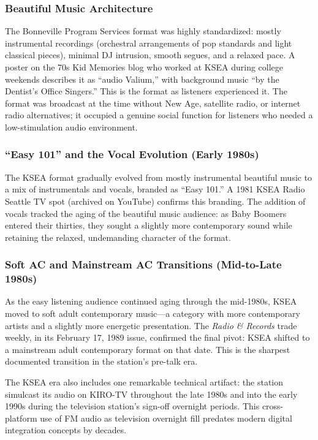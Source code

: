 \documentclass[11pt,letterpaper]{article}
\begin{document}
\subsubsection{Beautiful Music Architecture}

The Bonneville Program Services format was highly standardized: mostly instrumental recordings (orchestral arrangements of pop standards and light classical pieces), minimal DJ intrusion, smooth segues, and a relaxed pace. A poster on the 70s Kid Memories blog who worked at KSEA during college weekends describes it as ``audio Valium,'' with background music ``by the Dentist's Office Singers.'' This is the format as listeners experienced it. The format was broadcast at the time without New Age, satellite radio, or internet radio alternatives; it occupied a genuine social function for listeners who needed a low-stimulation audio environment.

\subsubsection{``Easy 101'' and the Vocal Evolution (Early 1980s)}

The KSEA format gradually evolved from mostly instrumental beautiful music to a mix of instrumentals and vocals, branded as ``Easy 101.'' A 1981 KSEA Radio Seattle TV spot (archived on YouTube) confirms this branding. The addition of vocals tracked the aging of the beautiful music audience: as Baby Boomers entered their thirties, they sought a slightly more contemporary sound while retaining the relaxed, undemanding character of the format.

\subsubsection{Soft AC and Mainstream AC Transitions (Mid-to-Late 1980s)}

As the easy listening audience continued aging through the mid-1980s, KSEA moved to soft adult contemporary music---a category with more contemporary artists and a slightly more energetic presentation. The \textit{Radio \& Records} trade weekly, in its February 17, 1989 issue, confirmed the final pivot: KSEA shifted to a mainstream adult contemporary format on that date. This is the sharpest documented transition in the station's pre-talk era.

The KSEA era also includes one remarkable technical artifact: the station simulcast its audio on KIRO-TV throughout the late 1980s and into the early 1990s during the television station's sign-off overnight periods. This cross-platform use of FM audio as television overnight fill predates modern digital integration concepts by decades.
\end{document}
